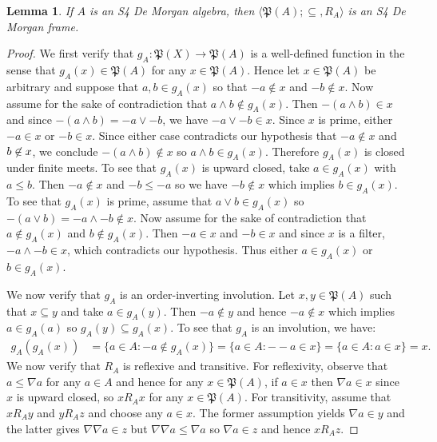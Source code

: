 \documentclass{amsart}
\theoremstyle{plain}
\newtheorem{lemma}[theorem]{Lemma}
\theoremstyle{definition}
\begin{document}
\begin{lemma}\label{lemma 3.9}
    If $A$ is an S4 De Morgan algebra, then $\langle\mathfrak{P}(A);\subseteq,R_A\rangle$ is an S4 De Morgan frame. 
\end{lemma}
\begin{proof}

We first verify that $g_A\colon\mathfrak{P}(X)\to\mathfrak{P}(A)$ is a well-defined function in the sense that $g_A(x)\in\mathfrak{P}(A)$ for any $x\in\mathfrak{P}(A)$. Hence let $x\in\mathfrak{P}(A)$ be arbitrary and suppose that $a,b\in g_A(x)$ so that $-a\not\in x$ and $-b\not\in x$. Now assume for the sake of contradiction that $a\wedge b\not\in g_A(x)$. Then $-(a\wedge b)\in x$ and since $-(a\wedge b)=-a\vee -b$, we have $-a\vee-b\in x$. Since $x$ is prime, either $-a\in x$ or $-b\in x$. Since either case contradicts our hypothesis that $-a\not\in x$ and $\-b\not\in x$, we conclude $-(a\wedge b)\not\in x$ so $a\wedge b\in g_A(x)$. Therefore $g_A(x)$ is closed under finite meets. To see that $g_A(x)$ is upward closed, take $a\in g_A(x)$ with $a\leq b$. Then $-a\not\in x$ and $-b\leq-a$ so we have $-b\not\in x$ which implies $b\in g_A(x)$. To see that $g_A(x)$ is prime, assume that $a\vee b\in g_A(x)$ so $-(a\vee b)=-a\wedge-b\not\in x$. Now assume for the sake of contradiction that $a\not\in g_A(x)$ and $b\not\in g_A(x)$. Then $-a\in x$ and $-b\in x$ and since $x$ is a filter, $-a\wedge-b\in x$, which contradicts our hypothesis. Thus either $a\in g_A(x)$ or $b\in g_A(x)$.  

     We now verify that $g_A$ is an order-inverting involution. Let $x,y\in\mathfrak{P}(A)$ such that $x\subseteq y$ and take $a\in g_A(y)$. Then $-a\not\in y$ and hence $-a\not\in x$ which implies $a\in g_A(a)$ so $g_A(y)\subseteq g_A(x)$. To see that $g_A$ is an involution, we have: 
\begin{align*}
    g_A(g_A(x))&=\{a\in A:-a\not\in g_A(x)\}=\{a\in A:--a\in x\}=\{a\in A:a\in x\}=x.
\end{align*}
     We now verify that $R_A$ is reflexive and transitive. For reflexivity, observe that $a\leq\nabla a$ for any $a\in A$ and hence for any $x\in\mathfrak{P}(A)$, if $a\in x$ then $\nabla a\in x$ since $x$ is upward closed, so $xR_Ax$ for any $x\in\mathfrak{P}(A)$. For transitivity, assume that $xR_Ay$ and $yR_Az$ and choose any $a\in x$. The former assumption yields $\nabla a\in y$ and the latter gives $\nabla\nabla a\in z$ but $\nabla\nabla a\leq\nabla a$ so $\nabla a\in z$ and hence $xR_Az$.  
\end{proof}
\end{document}
